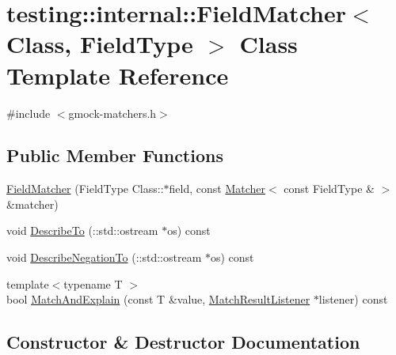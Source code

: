 \hypertarget{classtesting_1_1internal_1_1FieldMatcher}{}\section{testing\+:\+:internal\+:\+:Field\+Matcher$<$ Class, Field\+Type $>$ Class Template Reference}
\label{classtesting_1_1internal_1_1FieldMatcher}


{\ttfamily \#include $<$gmock-\/matchers.\+h$>$}

\subsection*{Public Member Functions}
\begin{DoxyCompactItemize}
\item 
\hyperlink{classtesting_1_1internal_1_1FieldMatcher_adf3435dcc9592b75e474cc90b1424952}{Field\+Matcher} (Field\+Type Class\+::$\ast$field, const \hyperlink{classtesting_1_1Matcher}{Matcher}$<$ const Field\+Type \& $>$ \&matcher)
\item 
void \hyperlink{classtesting_1_1internal_1_1FieldMatcher_ac3b02441e2254652579c6e98a25c9b5b}{Describe\+To} (\+::std\+::ostream $\ast$os) const 
\item 
void \hyperlink{classtesting_1_1internal_1_1FieldMatcher_aae4069f3686609c9612798e73f28ca05}{Describe\+Negation\+To} (\+::std\+::ostream $\ast$os) const 
\item 
{\footnotesize template$<$typename T $>$ }\\bool \hyperlink{classtesting_1_1internal_1_1FieldMatcher_a68fd542e3933c11da824e5e93d3f9858}{Match\+And\+Explain} (const T \&value, \hyperlink{classtesting_1_1MatchResultListener}{Match\+Result\+Listener} $\ast$listener) const 
\end{DoxyCompactItemize}


\subsection{Constructor \& Destructor Documentation}
